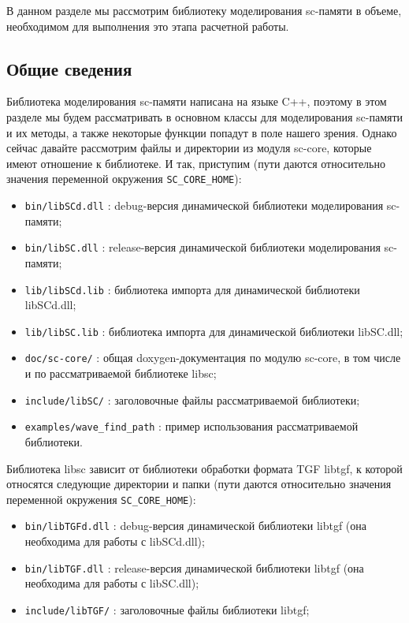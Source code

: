 В данном разделе мы рассмотрим библиотеку моделирования sc-памяти в
объеме, необходимом для выполнения это этапа расчетной работы.

\subsection{Общие сведения}

Библиотека моделирования sc-памяти написана на языке C++, поэтому в
этом разделе мы будем рассматривать в основном классы для
моделирования sc-памяти и их методы, а также некоторые функции попадут
в поле нашего зрения. Однако сейчас давайте рассмотрим файлы и
директории из модуля sc-core, которые имеют отношение к библиотеке. И
так, приступим (пути даются относительно значения переменной окружения
\verb|SC_CORE_HOME|):
\begin{itemize}
\item \verb|bin/libSCd.dll| : debug-версия динамической библиотеки
  моделирования sc-памяти;
\item \verb|bin/libSC.dll| : release-версия динамической библиотеки
  моделирования sc-памяти;
\item \verb|lib/libSCd.lib| : библиотека импорта для динамической библиотеки
  libSCd.dll;
\item \verb|lib/libSC.lib| : библиотека импорта для динамической библиотеки
  libSC.dll;
\item \verb|doc/sc-core/| : общая doxygen-документация по модулю
  sc-core, в том числе и по рассматриваемой библиотеке libsc;
\item \verb|include/libSC/| : заголовочные файлы рассматриваемой
  библиотеки;
\item \verb|examples/wave_find_path| : пример использования
  рассматриваемой библиотеки.
\end{itemize}

Библиотека libsc зависит от библиотеки обработки формата TGF libtgf, к
которой относятся следующие директории и папки (пути даются
относительно значения переменной окружения \verb|SC_CORE_HOME|):

\begin{itemize}
\item \verb|bin/libTGFd.dll| : debug-версия динамической библиотеки
  libtgf (она необходима для работы с libSCd.dll);
\item \verb|bin/libTGF.dll| : release-версия динамической библиотеки
  libtgf (она необходима для работы с libSC.dll);
\item \verb|include/libTGF/| : заголовочные файлы библиотеки libtgf;
\end{itemize}

